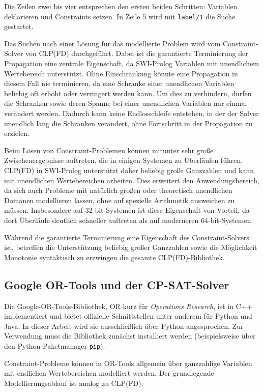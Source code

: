\documentclass[12pt,a4paper]{article}
\begin{document}
\noindent
Die Zeilen zwei bis vier entsprechen den ersten beiden Schritten: Variablen deklarieren und Constraints setzen.
In Zeile 5 wird mit \texttt{label/1} die Suche gestartet. 

Das Suchen nach einer Lösung für das modellierte Problem wird vom Constraint-Solver von CLP(FD) durchgeführt.
Dabei ist die garantierte Terminierung der Propagation eine zentrale Eigenschaft, da SWI-Prolog Variablen mit unendlichem Wertebereich unterstützt.
Ohne Einschränkung könnte eine Propagation in diesem Fall nie terminieren, da eine Schranke einer unendlichen Variablen beliebig oft erhöht oder verringert werden kann.
Um dies zu verhindern, dürfen die Schranken sowie deren Spanne bei einer unendlichen Variablen nur einmal verändert werden.
Dadurch kann keine Endlosschleife entstehen, in der der Solver unendlich lang die Schranken verändert, ohne Fortschritt in der Propagation zu erzielen.

Beim Lösen von Constraint-Problemen können mitunter sehr große Zwischenergebnisse auftreten, die in einigen Systemen zu Überläufen führen.
CLP(FD) in SWI-Prolog unterstützt daher beliebig große Ganzzahlen und kann mit unendlichen Wertebereichen arbeiten.
Dies erweitert den Anwendungsbereich, da sich auch Probleme mit natürlich großen oder theoretisch unendlichen Domänen modellieren lassen, ohne auf spezielle Arithmetik ausweichen zu müssen.
Insbesondere auf 32-bit-Systemen ist diese Eigenschaft von Vorteil, da dort Überläufe deutlich schneller auftreten als auf moderneren 64-bit-Systemen.

Während die garantierte Terminierung eine Eigenschaft des Constraint-Solvers ist, betreffen die Unterstützung beliebig großer Ganzzahlen sowie die Möglichkeit Monotonie syntaktisch zu erzwingen die gesamte CLP(FD)-Bibliothek.

\subsection{Google OR-Tools und der CP-SAT-Solver}
\label{sec:ortools}
Die Google-OR-Tools-Bibliothek, \glqq OR\grqq{} kurz für \emph{Operations Research}, ist in C++ implementiert und bietet offizielle Schnittstellen unter anderem für Python und Java.
In dieser Arbeit wird sie ausschließlich über Python angesprochen.
Zur Verwendung muss die Bibliothek zunächst installiert werden (beispielsweise über den Python-Paketmanager \texttt{pip}).

Constraint-Probleme können in OR-Tools allgemein über ganzzahlige Variablen mit endlichen Wertebereichen modelliert werden.
Der grundlegende Modellierungsablauf ist analog zu CLP(FD):
\end{document}
